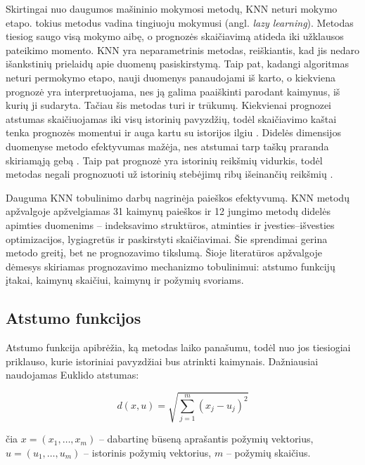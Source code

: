 Skirtingai nuo daugumos mašininio mokymosi metodų, KNN neturi mokymo etapo.
\cite{wettschereck1997} tokius metodus vadina tingiuoju mokymusi (angl. \textit{lazy learning}). Metodas tiesiog saugo visą mokymo aibę, o prognozės skaičiavimą atideda iki užklausos pateikimo momento.
KNN yra neparametrinis metodas, reiškiantis, kad jis nedaro išankstinių prielaidų apie duomenų pasiskirstymą.
Taip pat, kadangi algoritmas neturi permokymo etapo, nauji duomenys panaudojami iš karto, o kiekviena prognozė yra interpretuojama, nes ją galima paaiškinti parodant kaimynus, iš kurių ji sudaryta.
Tačiau šis metodas turi ir trūkumų.
Kiekvienai prognozei atstumas skaičiuojamas iki visų istorinių pavyzdžių, todėl skaičiavimo kaštai tenka prognozės momentui ir auga kartu su istorijos ilgiu \cite{halder2024}.
Didelės dimensijos duomenyse metodo efektyvumas mažėja, nes atstumai tarp taškų praranda skiriamąją gebą \cite{halder2024}.
Taip pat prognozė yra istorinių reikšmių vidurkis, todėl metodas negali prognozuoti už istorinių stebėjimų ribų išeinančių reikšmių \cite{martinez2019}.

Dauguma KNN tobulinimo darbų nagrinėja paieškos efektyvumą.
KNN metodų apžvalgoje \cite{halder2024} apžvelgiamas 31 kaimynų paieškos ir 12 jungimo metodų didelės apimties duomenims -- indeksavimo struktūros, atminties ir įvesties--išvesties optimizacijos, lygiagretūs ir paskirstyti skaičiavimai.
Šie sprendimai gerina metodo greitį, bet ne prognozavimo tikslumą.
Šioje literatūros apžvalgoje dėmesys skiriamas prognozavimo mechanizmo tobulinimui: atstumo funkcijų įtakai, kaimynų skaičiui, kaimynų ir požymių svoriams.


\subsection{Atstumo funkcijos}

Atstumo funkcija apibrėžia, ką metodas laiko panašumu, todėl nuo jos tiesiogiai priklauso, kurie istoriniai pavyzdžiai bus atrinkti kaimynais.
Dažniausiai naudojamas Euklido atstumas:

\begin{equation}
    d(x, u) = \sqrt{\sum_{j=1}^{m} (x_j - u_j)^2}
    \label{eq:euklidas}
\end{equation}

čia $x = (x_1, \dots, x_m)$ -- dabartinę būseną aprašantis požymių vektorius, $u = (u_1, \dots, u_m)$ -- istorinis požymių vektorius, $m$ -- požymių skaičius.

